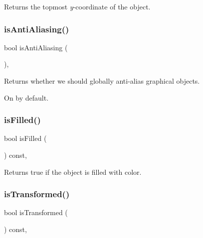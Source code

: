 Returns the topmost {\itshape y}-\/coordinate of the object. 

\mbox{\label{classsgl_1_1GObject_a93be0e1fe1b1bf1a1da732470c94f42b}} 
\subsubsection{\texorpdfstring{is\+Anti\+Aliasing()}{isAntiAliasing()}}
{\footnotesize\ttfamily bool is\+Anti\+Aliasing (\begin{DoxyParamCaption}{ }\end{DoxyParamCaption})\hspace{0.3cm}{\ttfamily [static]}, {\ttfamily [inherited]}}



Returns whether we should globally anti-\/alias graphical objects. 

On by default. \mbox{\label{classsgl_1_1GObject_a11c404f106940c201b6f326e0355c150}} 
\subsubsection{\texorpdfstring{is\+Filled()}{isFilled()}}
{\footnotesize\ttfamily bool is\+Filled (\begin{DoxyParamCaption}{ }\end{DoxyParamCaption}) const\hspace{0.3cm}{\ttfamily [virtual]}, {\ttfamily [inherited]}}



Returns {\ttfamily true} if the object is filled with color. 

\mbox{\label{classsgl_1_1GObject_a9de207581cfa4ca1eaa06da5f29b75fc}} 
\subsubsection{\texorpdfstring{is\+Transformed()}{isTransformed()}}
{\footnotesize\ttfamily bool is\+Transformed (\begin{DoxyParamCaption}{ }\end{DoxyParamCaption}) const\hspace{0.3cm}{\ttfamily [virtual]}, {\ttfamily [inherited]}}



